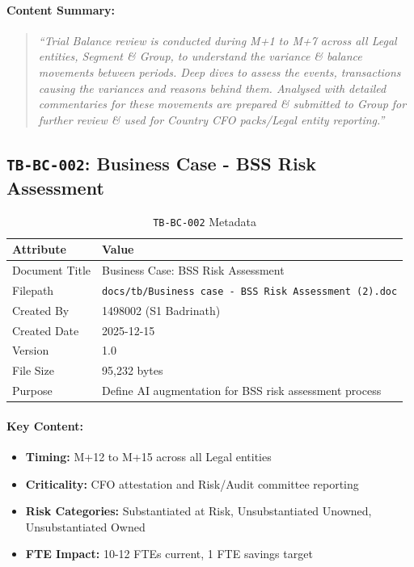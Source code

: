 \documentclass[11pt,a4paper,twoside]{report}
\newcommand{\srcref}[1]{\texttt{#1}}
\begin{document}
\paragraph{Content Summary:}
\begin{quote}
\textit{``Trial Balance review is conducted during M+1 to M+7 across all Legal entities,
Segment \& Group, to understand the variance \& balance movements between periods.
Deep dives to assess the events, transactions causing the variances and reasons
behind them. Analysed with detailed commentaries for these movements are prepared \&
submitted to Group for further review \& used for Country CFO packs/Legal entity reporting.''}
\end{quote}

\subsection{\srcref{TB-BC-002}: Business Case - BSS Risk Assessment}
\label{sec:tb-bc-002}

\begin{table}[h]
\centering
\caption{\srcref{TB-BC-002} Metadata}
\begin{tabularx}{\textwidth}{@{}L{4cm}L{10cm}@{}}
\toprule
\textbf{Attribute} & \textbf{Value} \\
\midrule
Document Title & Business Case: BSS Risk Assessment \\
Filepath & \texttt{docs/tb/Business case - BSS Risk Assessment (2).doc} \\
Created By & 1498002 (S1 Badrinath) \\
Created Date & 2025-12-15 \\
Version & 1.0 \\
File Size & 95,232 bytes \\
Purpose & Define AI augmentation for BSS risk assessment process \\
\bottomrule
\end{tabularx}
\end{table}

\paragraph{Key Content:}
\begin{itemize}[noitemsep]
\item \textbf{Timing:} M+12 to M+15 across all Legal entities
\item \textbf{Criticality:} CFO attestation and Risk/Audit committee reporting
\item \textbf{Risk Categories:} Substantiated at Risk, Unsubstantiated Unowned, Unsubstantiated Owned
\item \textbf{FTE Impact:} 10-12 FTEs current, 1 FTE savings target
\end{itemize}
\end{document}
